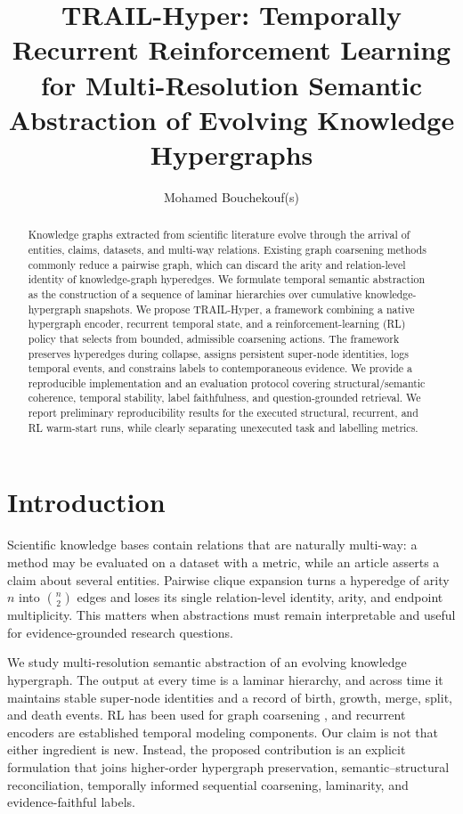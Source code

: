 \documentclass[11pt]{article}
\title{TRAIL-Hyper: Temporally Recurrent Reinforcement Learning for Multi-Resolution Semantic Abstraction of Evolving Knowledge Hypergraphs}
\author{Mohamed Bouchekouf(s)}
\date{}
\begin{document}
\maketitle

\begin{abstract}
Knowledge graphs extracted from scientific literature evolve through the arrival of entities, claims, datasets, and multi-way relations. Existing graph coarsening methods commonly reduce a pairwise graph, which can discard the arity and relation-level identity of knowledge-graph hyperedges. We formulate temporal semantic abstraction as the construction of a sequence of laminar hierarchies over cumulative knowledge-hypergraph snapshots. We propose TRAIL-Hyper, a framework combining a native hypergraph encoder, recurrent temporal state, and a reinforcement-learning (RL) policy that selects from bounded, admissible coarsening actions. The framework preserves hyperedges during collapse, assigns persistent super-node identities, logs temporal events, and constrains labels to contemporaneous evidence. We provide a reproducible implementation and an evaluation protocol covering structural/semantic coherence, temporal stability, label faithfulness, and question-grounded retrieval. We report preliminary reproducibility results for the executed structural, recurrent, and RL warm-start runs, while clearly separating unexecuted task and labelling metrics.
\end{abstract}

\section{Introduction}
Scientific knowledge bases contain relations that are naturally multi-way: a method may be evaluated on a dataset with a metric, while an article asserts a claim about several entities. Pairwise clique expansion turns a hyperedge of arity $n$ into $\binom{n}{2}$ edges and loses its single relation-level identity, arity, and endpoint multiplicity. This matters when abstractions must remain interpretable and useful for evidence-grounded research questions.

We study multi-resolution semantic abstraction of an evolving knowledge hypergraph. The output at every time is a laminar hierarchy, and across time it maintains stable super-node identities and a record of birth, growth, merge, split, and death events. RL has been used for graph coarsening \cite{taghibakhshi2021}, and recurrent encoders are established temporal modeling components. Our claim is not that either ingredient is new. Instead, the proposed contribution is an explicit formulation that joins higher-order hypergraph preservation, semantic--structural reconciliation, temporally informed sequential coarsening, laminarity, and evidence-faithful labels.
\end{document}
